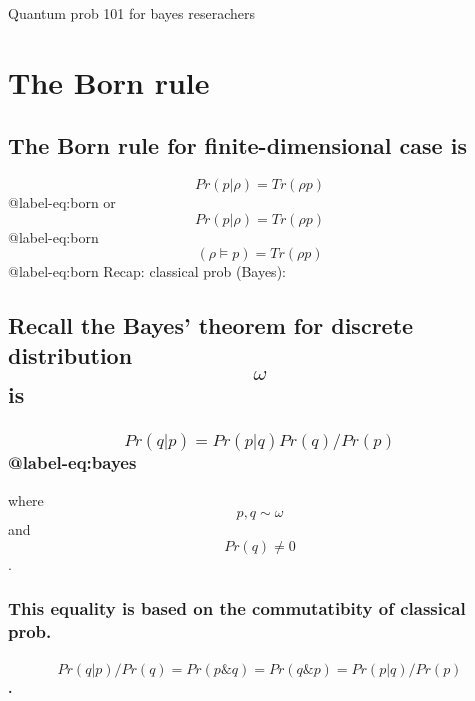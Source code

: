 Quantum prob 101 for bayes reserachers

\hypertarget{the-born-rule}{%
\section{The Born rule}\label{the-born-rule}}

\hypertarget{the-born-rule-for-finite-dimensional-case-is}{%
\subsection{The Born rule for finite-dimensional case
is}\label{the-born-rule-for-finite-dimensional-case-is}}

\[Pr(p|\rho) = Tr(\rho p)\] @label-eq:born or
\[Pr(p|\rho) = Tr(\rho p)\] @label-eq:born
\[(\rho \vDash p) = Tr(\rho p)\] @label-eq:born Recap: classical prob
(Bayes):

\hypertarget{recall-the-bayes-theorem-for-discrete-distribution-omega-is}{%
\subsection{\texorpdfstring{Recall the Bayes' theorem for discrete
distribution \[\omega\]
is}{Recall the Bayes' theorem for discrete distribution \textbackslash{}omega is}}\label{recall-the-bayes-theorem-for-discrete-distribution-omega-is}}

\hypertarget{prqp-prpqprqprp-label-eqbayes}{%
\subsubsection{\texorpdfstring{\[Pr(q|p) = Pr(p|q)Pr(q)/Pr(p)\]
@label-eq:bayes}{Pr(q\textbar{}p) = Pr(p\textbar{}q)Pr(q)/Pr(p) @label-eq:bayes}}\label{prqp-prpqprqprp-label-eqbayes}}

where \[p, q \sim \omega\] and \[Pr(q) \neq 0\].

\hypertarget{this-equality-is-based-on-the-commutatibity-of-classical-prob.}{%
\subsubsection{This equality is based on the commutatibity of classical
prob.}\label{this-equality-is-based-on-the-commutatibity-of-classical-prob.}}

\hypertarget{prqpprq-prp-q-prq-p-prpqprp.}{%
\paragraph{\texorpdfstring{\[Pr(q|p)/Pr(q) = Pr(p \& q) = Pr(q \& p) = Pr(p|q)/Pr(p)\].}{Pr(q\textbar{}p)/Pr(q) = Pr(p \textbackslash{}\& q) = Pr(q \textbackslash{}\& p) = Pr(p\textbar{}q)/Pr(p).}}\label{prqpprq-prp-q-prq-p-prpqprp.}}


